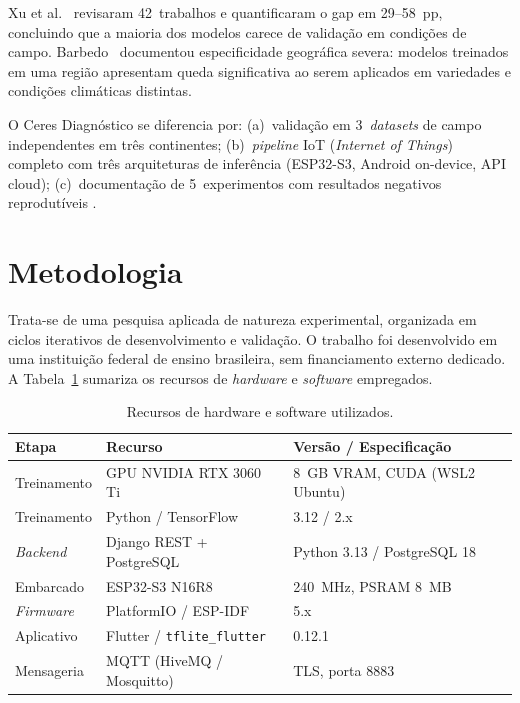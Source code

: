 \documentclass[12pt]{article}
\begin{document}
Xu et al.~\cite{xu2024} revisaram 42~trabalhos e quantificaram o gap em 29--58~pp,
concluindo que a maioria dos modelos carece de validação em condições de campo.
Barbedo~\cite{barbedo2019} documentou especificidade geográfica severa: modelos
treinados em uma região apresentam queda significativa ao serem aplicados em
variedades e condições climáticas distintas.

O Ceres Diagnóstico se diferencia por: (a)~validação em 3~\textit{datasets} de campo
independentes em três continentes; (b)~\textit{pipeline} IoT (\textit{Internet of
Things}) completo com três arquiteturas de inferência (ESP32-S3, Android on-device,
API cloud); (c)~documentação de
5~experimentos com resultados negativos reprodutíveis \cite{pineau2021}.


\section{Metodologia}

Trata-se de uma pesquisa aplicada de natureza experimental, organizada em ciclos
iterativos de desenvolvimento e validação. O trabalho foi desenvolvido em uma instituição federal de ensino brasileira, sem financiamento externo dedicado. A Tabela~\ref{tab:recursos}
sumariza os recursos de \textit{hardware} e \textit{software} empregados.

\begin{table}[ht]
\centering
\caption{Recursos de hardware e software utilizados.}
\label{tab:recursos}
\begin{tabular}{@{}lll@{}}
\toprule
\textbf{Etapa} & \textbf{Recurso} & \textbf{Versão / Especificação} \\
\midrule
Treinamento  & GPU NVIDIA RTX 3060 Ti           & 8~GB VRAM, CUDA (WSL2 Ubuntu) \\
Treinamento  & Python / TensorFlow              & 3.12 / 2.x \\
\textit{Backend} & Django REST + PostgreSQL      & Python 3.13 / PostgreSQL 18 \\
Embarcado    & ESP32-S3 N16R8                   & 240~MHz, PSRAM 8~MB \\
\textit{Firmware} & PlatformIO / ESP-IDF         & 5.x \\
Aplicativo   & Flutter / \texttt{tflite\_flutter} & 0.12.1 \\
Mensageria   & MQTT (HiveMQ / Mosquitto)        & TLS, porta 8883 \\
\bottomrule
\end{tabular}
\end{table}
\end{document}
